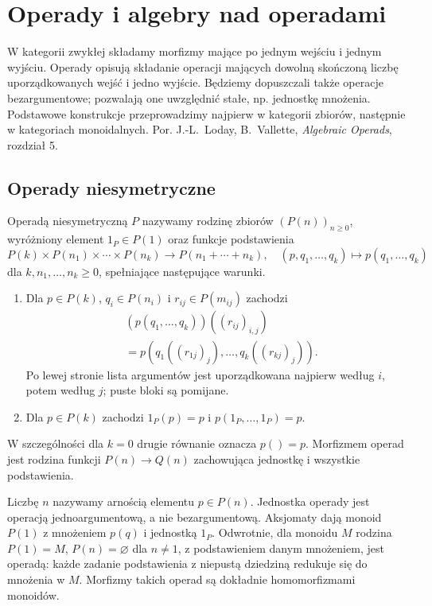 \section{Operady i algebry nad operadami}\label{cat:sec:operads}

W kategorii zwykłej składamy morfizmy mające po jednym wejściu i jednym wyjściu. Operady opisują składanie operacji mających dowolną skończoną liczbę uporządkowanych wejść i jedno wyjście. Będziemy dopuszczali także operacje bezargumentowe; pozwalają one uwzględnić stałe, np. jednostkę mnożenia. Podstawowe konstrukcje przeprowadzimy najpierw w kategorii zbiorów, następnie w kategoriach monoidalnych. Por. J.-L.~Loday, B.~Vallette, \emph{Algebraic Operads}, rozdział 5.

\subsection{Operady niesymetryczne}

\begin{definicja}\label{cat:def:ns-operad}
Operadą niesymetryczną $P$ nazywamy rodzinę zbiorów $(P(n))_{n\geq0}$, wyróżniony element $1_P\in P(1)$ oraz funkcje podstawienia
\[
 P(k)\times P(n_1)\times\cdots\times P(n_k)
 \longrightarrow P(n_1+\cdots+n_k),
 \quad (p,q_1,\ldots,q_k)\longmapsto p(q_1,\ldots,q_k)
\]
dla $k,n_1,\ldots,n_k\geq0$, spełniające następujące warunki.
\begin{enumerate}
\item Dla $p\in P(k)$, $q_i\in P(n_i)$ i $r_{ij}\in P(m_{ij})$ zachodzi
\[
\begin{aligned}
 &(p(q_1,\ldots,q_k))((r_{ij})_{i,j})\\
 &=p(q_1((r_{1j})_j),\ldots,q_k((r_{kj})_j)).
\end{aligned}
\]
Po lewej stronie lista argumentów jest uporządkowana najpierw według $i$, potem według $j$; puste bloki są pomijane.
\item Dla $p\in P(k)$ zachodzi $1_P(p)=p$ i $p(1_P,\ldots,1_P)=p$.
\end{enumerate}
W szczególności dla $k=0$ drugie równanie oznacza $p()=p$.
Morfizmem operad jest rodzina funkcji $P(n)\to Q(n)$ zachowująca jednostkę i wszystkie podstawienia.
\end{definicja}

Liczbę $n$ nazywamy arnością elementu $p\in P(n)$. Jednostka operady jest operacją jednoargumentową, a nie bezargumentową. Aksjomaty dają monoid $P(1)$ z mnożeniem $p(q)$ i jednostką $1_P$. Odwrotnie, dla monoidu $M$ rodzina $P(1)=M$, $P(n)=\varnothing$ dla $n\ne1$, z podstawieniem danym mnożeniem, jest operadą: każde zadanie podstawienia z niepustą dziedziną redukuje się do mnożenia w $M$. Morfizmy takich operad są dokładnie homomorfizmami monoidów.

